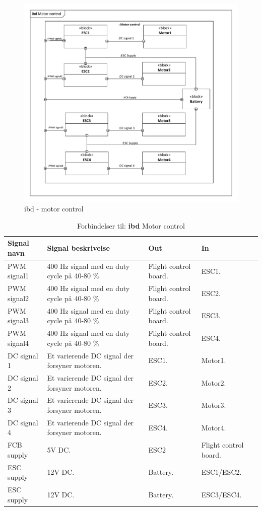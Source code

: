 
\begin{figure}[H]
\centering
\includegraphics[width=1\textwidth]{Billeder/IBD/ibd6_motorcontrol.pdf}
\caption{ibd - motor control}
\label{fig:ibd_motorcontrol}
\end{figure}

\begin{table}[H]
	\centering
		\begin{tabular}{|p{2.5 cm}|p{5.5 cm}|p{2.5 cm}|p{2.5 cm}|} 
		\hline
			\textbf{Signal navn} 	& \textbf{Signal beskrivelse}		& \textbf{Out} 				& \textbf{In}     \\ \hline
			PWM signal1 & 400 Hz signal med en duty cycle på 40-80 $\%$ & Flight control board. & ESC1.	\\ \hline
			PWM signal2 & 400 Hz signal med en duty cycle på 40-80 $\%$ & Flight control board. & ESC2.	\\ \hline
			PWM signal3 & 400 Hz signal med en duty cycle på 40-80 $\%$ & Flight control board. &	ESC3. \\ \hline
			PWM signal4 & 400 Hz signal med en duty cycle på 40-80 $\%$ & Flight control board. & ESC4. \\ \hline
			DC signal 1 & Et varierende DC signal der forsyner motoren. & ESC1. & Motor1.	\\ \hline
			DC signal 2 & Et varierende DC signal der forsyner motoren. & ESC2. & Motor2.	\\ \hline
			DC signal 3 & Et varierende DC signal der forsyner motoren. & ESC3. & Motor3.	\\ \hline
			DC signal 4 & Et varierende DC signal der forsyner motoren. & ESC4. & Motor4.	\\ \hline
			FCB supply & 5V DC. & ESC2 & Flight control board.	\\ \hline
			ESC supply & 12V DC. & Battery. & ESC1/ESC2.	\\ \hline
			ESC supply & 12V DC. & Battery. & ESC3/ESC4.	\\ \hline
		\end{tabular}
	\caption{Forbindelser til: \textbf{ibd} Motor control}
	\label{tab:IBD_Motor_control}
\end{table}

